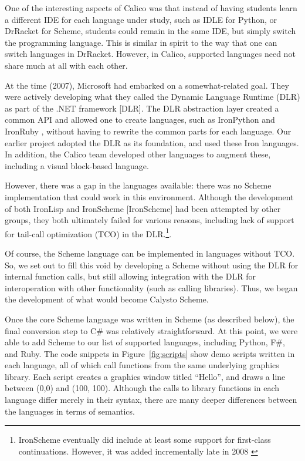 \documentclass[acmsmall,screen,authorversion]{acmart}
\begin{document}
One of the interesting aspects of Calico was that instead of having
students learn a different IDE for each language under study, such as
IDLE for Python, or DrRacket for Scheme, students could remain in the
same IDE, but simply switch the programming language. This is similar
in spirit to the way that one can switch languages in
DrRacket. However, in Calico, supported languages need not share much
at all with each other.

At the time (2007), Microsoft had embarked on a somewhat-related
goal. They were actively developing what they called the Dynamic
Language Runtime (DLR) as part of the .NET framework [DLR]. The DLR
abstraction layer created a common API and allowed one to create
languages, such as IronPython and IronRuby \cite{IronRuby}, without
having to rewrite the common parts for each language. Our earlier
project adopted the DLR as its foundation, and used these Iron
languages. In addition, the Calico team developed other languages to
augment these, including a visual block-based language.

However, there was a gap in the languages available: there was no
Scheme implementation that could work in this environment. Although
the development of both IronLisp and IronScheme [IronScheme] had been
attempted by other groups, they both ultimately failed for various
reasons, including lack of support for tail-call optimization (TCO) in
the DLR.\footnote[1]{IronScheme eventually did include at least some
support for first-class continuations. However, it was added
incrementally late in 2008 \cite{IronScheme}}.

Of course, the Scheme language can be implemented in languages without
TCO. So, we set out to fill this void by developing a Scheme without
using the DLR for internal function calls, but still allowing
integration with the DLR for interoperation with other functionality
(such as calling libraries). Thus, we began the development of what
would become Calysto Scheme.

Once the core Scheme language was written in Scheme (as described below), the
final conversion step to C\# was relatively straightforward. At this point, we
were able to add Scheme to our list of supported languages, including Python,
F\#, and Ruby.  The code snippets in Figure~\ref{fig:scripts} show demo scripts
written in each language, all of which call functions from the same underlying
graphics library. Each script creates a graphics window titled ``Hello'', and
draws a line between (0,0) and (100, 100). Although the calls to library
functions in each language differ merely in their syntax, there are many deeper
differences between the languages in terms of semantics.
\end{document}
